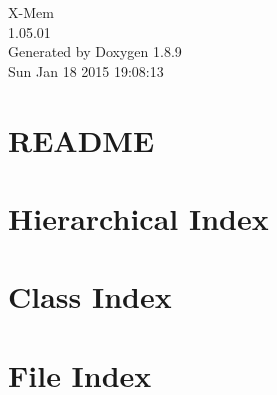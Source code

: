 \documentclass[twoside]{book}
\newcommand{\+}{\discretionary{\mbox{\scriptsize$\hookleftarrow$}}{}{}}
\newcommand{\clearemptydoublepage}{%
  \newpage{\pagestyle{empty}\cleardoublepage}%
}
\begin{document}
\hypersetup{pageanchor=false,
             bookmarks=true,
             bookmarksnumbered=true,
             pdfencoding=unicode
            }
\begin{titlepage}
\vspace*{7cm}
\begin{center}%
{\Large X-\/\+Mem \\[1ex]\large 1.\+05.\+01 }\\
\vspace*{1cm}
{\large Generated by Doxygen 1.8.9}\\
\vspace*{0.5cm}
{\small Sun Jan 18 2015 19:08:13}\\
\end{center}
\end{titlepage}
\clearemptydoublepage
\tableofcontents
\clearemptydoublepage
{}
\hypersetup{pageanchor=true}

\chapter{R\+E\+A\+D\+M\+E}
\label{md_src__r_e_a_d_m_e}
\hypertarget{md_src__r_e_a_d_m_e}{}

\chapter{Hierarchical Index}

\chapter{Class Index}

\chapter{File Index}

\end{document}
